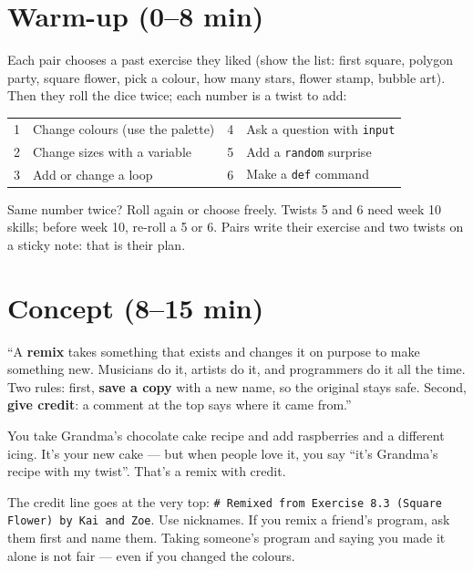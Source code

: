 \section{Warm-up (0--8 min)}
\begin{unplugged}
Each pair chooses a past exercise they liked (show the list: first square, polygon party, square flower, pick a colour, how many stars, flower stamp, bubble art). Then they roll the dice twice; each number is a twist to add:
\begin{center}\small
\begin{tabular}{@{}cl@{\qquad}cl@{}}
\toprule
1 & Change colours (use the palette) & 4 & Ask a question with \texttt{input} \\
2 & Change sizes with a variable & 5 & Add a \texttt{random} surprise \\
3 & Add or change a loop & 6 & Make a \texttt{def} command \\
\bottomrule
\end{tabular}
\end{center}
Same number twice? Roll again or choose freely. Twists 5 and 6 need week 10 skills; before week 10, re-roll a 5 or 6. Pairs write their exercise and two twists on a sticky note: that is their plan.
\end{unplugged}

\section{Concept (8--15 min)}
\begin{teacherscript}
\enquote{A \textbf{remix} takes something that exists and changes it on purpose to make something new. Musicians do it, artists do it, and programmers do it all the time. Two rules: first, \textbf{save a copy} with a new name, so the original stays safe. Second, \textbf{give credit}: a comment at the top says where it came from.}
\end{teacherscript}
\begin{analogy}
You take Grandma's chocolate cake recipe and add raspberries and a different icing. It's your new cake --- but when people love it, you say \enquote{it's Grandma's recipe with my twist}. That's a remix with credit.
\end{analogy}
\begin{safety}
The credit line goes at the very top: \texttt{\# Remixed from Exercise 8.3 (Square Flower) by Kai and Zoe}. Use nicknames. If you remix a friend's program, ask them first and name them. Taking someone's program and saying you made it alone is not fair --- even if you changed the colours.
\end{safety}

